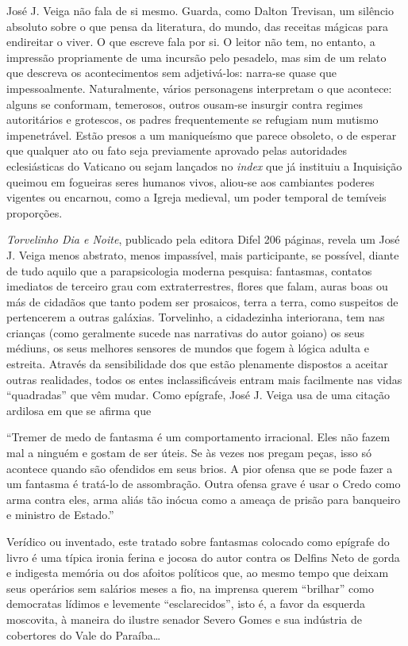 \documentclass[
  letterpaper,
  DIV=11,
  numbers=noendperiod]{scrartcl}
\begin{document}
José J. Veiga não fala de si mesmo. Guarda, como Dalton Trevisan, um
silêncio absoluto sobre o que pensa da literatura, do mundo, das
receitas mágicas para endireitar o viver. O que escreve fala por si. O
leitor não tem, no entanto, a impressão propriamente de uma incursão
pelo pesadelo, mas sim de um relato que descreva os acontecimentos sem
adjetivá-los: narra-se quase que impessoalmente. Naturalmente, vários
personagens interpretam o que acontece: alguns se conformam, temerosos,
outros ousam-se insurgir contra regimes autoritários e grotescos, os
padres frequentemente se refugiam num mutismo impenetrável. Estão presos
a um maniqueísmo que parece obsoleto, o de esperar que qualquer ato ou
fato seja previamente aprovado pelas autoridades eclesiásticas do
Vaticano ou sejam lançados no \emph{index} que já instituiu a Inquisição
queimou em fogueiras seres humanos vivos, aliou-se aos cambiantes
poderes vigentes ou encarnou, como a Igreja medieval, um poder temporal
de temíveis proporções.

\emph{Torvelinho Dia e Noite}, publicado pela editora Difel 206 páginas,
revela um José J. Veiga menos abstrato, menos impassível, mais
participante, se possível, diante de tudo aquilo que a parapsicologia
moderna pesquisa: fantasmas, contatos imediatos de terceiro grau com
extraterrestres, flores que falam, auras boas ou más de cidadãos que
tanto podem ser prosaicos, terra a terra, como suspeitos de pertencerem
a outras galáxias. Torvelinho, a cidadezinha interiorana, tem nas
crianças (como geralmente sucede nas narrativas do autor goiano) os seus
médiuns, os seus melhores sensores de mundos que fogem à lógica adulta e
estreita. Através da sensibilidade dos que estão plenamente dispostos a
aceitar outras realidades, todos os entes inclassificáveis entram mais
facilmente nas vidas ``quadradas'' que vêm mudar. Como epígrafe, José J.
Veiga usa de uma citação ardilosa em que se afirma que

``Tremer de medo de fantasma é um comportamento irracional. Eles não
fazem mal a ninguém e gostam de ser úteis. Se às vezes nos pregam peças,
isso só acontece quando são ofendidos em seus brios. A pior ofensa que
se pode fazer a um fantasma é tratá-lo de assombração. Outra ofensa
grave é usar o Credo como arma contra eles, arma aliás tão inócua como a
ameaça de prisão para banqueiro e ministro de Estado.''

Verídico ou inventado, este tratado sobre fantasmas colocado como
epígrafe do livro é uma típica ironia ferina e jocosa do autor contra os
Delfins Neto de gorda e indigesta memória ou dos afoitos políticos que,
ao mesmo tempo que deixam seus operários sem salários meses a fio, na
imprensa querem ``brilhar'' como democratas lídimos e levemente
``esclarecidos'', isto é, a favor da esquerda moscovita, à maneira do
ilustre senador Severo Gomes e sua indústria de cobertores do Vale do
Paraíba\ldots{}
\end{document}
